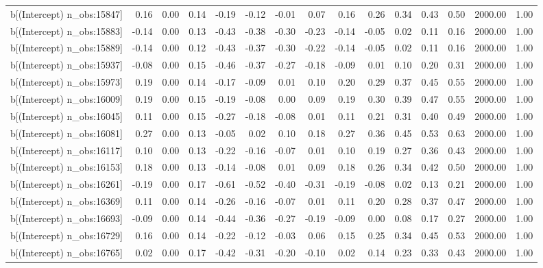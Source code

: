 \begin{table}[ht]
\begin{tabular}{rrrrrrrrrrrrrrr}
  b[(Intercept) n\_obs:15847] & 0.16 & 0.00 & 0.14 & -0.19 & -0.12 & -0.01 & 0.07 & 0.16 & 0.26 & 0.34 & 0.43 & 0.50 & 2000.00 & 1.00 \\ 
  b[(Intercept) n\_obs:15883] & -0.14 & 0.00 & 0.13 & -0.43 & -0.38 & -0.30 & -0.23 & -0.14 & -0.05 & 0.02 & 0.11 & 0.16 & 2000.00 & 1.00 \\ 
  b[(Intercept) n\_obs:15889] & -0.14 & 0.00 & 0.12 & -0.43 & -0.37 & -0.30 & -0.22 & -0.14 & -0.05 & 0.02 & 0.11 & 0.16 & 2000.00 & 1.00 \\ 
  b[(Intercept) n\_obs:15937] & -0.08 & 0.00 & 0.15 & -0.46 & -0.37 & -0.27 & -0.18 & -0.09 & 0.01 & 0.10 & 0.20 & 0.31 & 2000.00 & 1.00 \\ 
  b[(Intercept) n\_obs:15973] & 0.19 & 0.00 & 0.14 & -0.17 & -0.09 & 0.01 & 0.10 & 0.20 & 0.29 & 0.37 & 0.45 & 0.55 & 2000.00 & 1.00 \\ 
  b[(Intercept) n\_obs:16009] & 0.19 & 0.00 & 0.15 & -0.19 & -0.08 & 0.00 & 0.09 & 0.19 & 0.30 & 0.39 & 0.47 & 0.55 & 2000.00 & 1.00 \\ 
  b[(Intercept) n\_obs:16045] & 0.11 & 0.00 & 0.15 & -0.27 & -0.18 & -0.08 & 0.01 & 0.11 & 0.21 & 0.31 & 0.40 & 0.49 & 2000.00 & 1.00 \\ 
  b[(Intercept) n\_obs:16081] & 0.27 & 0.00 & 0.13 & -0.05 & 0.02 & 0.10 & 0.18 & 0.27 & 0.36 & 0.45 & 0.53 & 0.63 & 2000.00 & 1.00 \\ 
  b[(Intercept) n\_obs:16117] & 0.10 & 0.00 & 0.13 & -0.22 & -0.16 & -0.07 & 0.01 & 0.10 & 0.19 & 0.27 & 0.36 & 0.43 & 2000.00 & 1.00 \\ 
  b[(Intercept) n\_obs:16153] & 0.18 & 0.00 & 0.13 & -0.14 & -0.08 & 0.01 & 0.09 & 0.18 & 0.26 & 0.34 & 0.42 & 0.50 & 2000.00 & 1.00 \\ 
  b[(Intercept) n\_obs:16261] & -0.19 & 0.00 & 0.17 & -0.61 & -0.52 & -0.40 & -0.31 & -0.19 & -0.08 & 0.02 & 0.13 & 0.21 & 2000.00 & 1.00 \\ 
  b[(Intercept) n\_obs:16369] & 0.11 & 0.00 & 0.14 & -0.26 & -0.16 & -0.07 & 0.01 & 0.11 & 0.20 & 0.28 & 0.37 & 0.47 & 2000.00 & 1.00 \\ 
  b[(Intercept) n\_obs:16693] & -0.09 & 0.00 & 0.14 & -0.44 & -0.36 & -0.27 & -0.19 & -0.09 & 0.00 & 0.08 & 0.17 & 0.27 & 2000.00 & 1.00 \\ 
  b[(Intercept) n\_obs:16729] & 0.16 & 0.00 & 0.14 & -0.22 & -0.12 & -0.03 & 0.06 & 0.15 & 0.25 & 0.34 & 0.45 & 0.53 & 2000.00 & 1.00 \\ 
  b[(Intercept) n\_obs:16765] & 0.02 & 0.00 & 0.17 & -0.42 & -0.31 & -0.20 & -0.10 & 0.02 & 0.14 & 0.23 & 0.33 & 0.43 & 2000.00 & 1.00 \\ 

\end{tabular}
\end{table}
